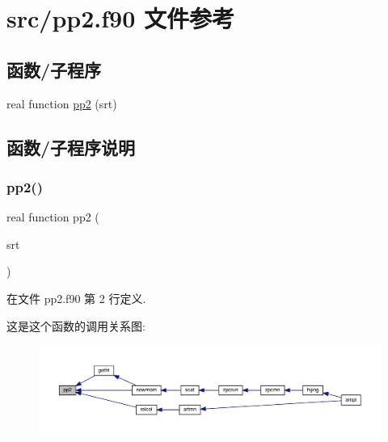\hypertarget{pp2_8f90}{}\section{src/pp2.f90 文件参考}
\label{pp2_8f90}
\subsection*{函数/子程序}
\begin{DoxyCompactItemize}
\item 
real function \mbox{\hyperlink{pp2_8f90_abd04c01efbaa454577eac785f7a4889b}{pp2}} (srt)
\end{DoxyCompactItemize}


\subsection{函数/子程序说明}
\mbox{\label{pp2_8f90_abd04c01efbaa454577eac785f7a4889b}} 
\subsubsection{\texorpdfstring{pp2()}{pp2()}}
{\footnotesize\ttfamily real function pp2 (\begin{DoxyParamCaption}\item[{}]{srt }\end{DoxyParamCaption})}



在文件 pp2.\+f90 第 2 行定义.

这是这个函数的调用关系图\+:
\nopagebreak
\begin{figure}[H]
\begin{center}
\leavevmode
\includegraphics[width=350pt]{pp2_8f90_abd04c01efbaa454577eac785f7a4889b_icgraph}
\end{center}
\end{figure}
